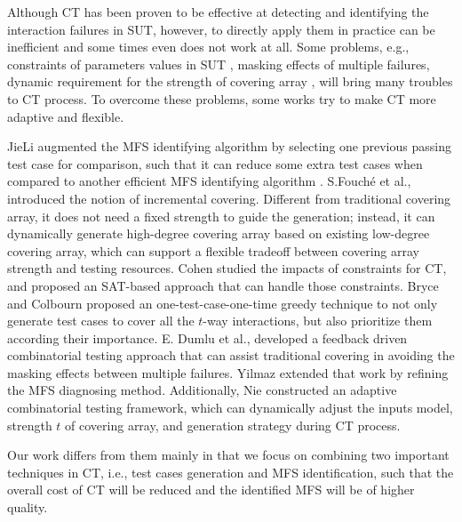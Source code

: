 \documentclass{sig-alternate}
\begin{document}
Although CT has been proven to be effective at detecting and identifying the interaction failures in SUT, however, to directly apply them in practice can be inefficient and some times even does not work at all. Some problems, e.g., constraints of parameters values in SUT \cite{cohen2007exploiting,cohen2008constructing}, masking effects of multiple failures\cite{dumlu2011feedback,yilmaz2013reducing}, dynamic requirement for the strength of covering array \cite{fouche2009incremental}, will bring many troubles to CT process. To overcome these problems, some works try to make CT more adaptive and flexible.


JieLi \cite{li2012improved} augmented the MFS identifying algorithm by selecting one previous passing test case for comparison, such that it can reduce some extra test cases when compared to another efficient MFS identifying algorithm \cite{zhang2011characterizing}. S.Fouch{\'e}  et al., \cite{fouche2009incremental} introduced the notion of incremental covering. Different from traditional covering array, it does not need a fixed strength to guide the generation; instead, it can dynamically generate high-degree covering array based on existing low-degree covering array, which can support a flexible tradeoff between covering array strength and testing resources. Cohen \cite{cohen2007exploiting,cohen2008constructing} studied the impacts of constraints for CT, and proposed an SAT-based approach that can handle those constraints.  Bryce and Colbourn \cite{bryce2006prioritized} proposed an one-test-case-one-time greedy technique to not only generate test cases to cover all the $t$-way interactions, but also prioritize them according their importance.  E. Dumlu et al., \cite{dumlu2011feedback} developed a feedback driven
combinatorial testing approach that can assist traditional covering in avoiding the masking effects between multiple failures. Yilmaz \cite{yilmaz2013reducing} extended that work by refining the MFS diagnosing method. Additionally, Nie \cite{nie2013adaptive} constructed an adaptive combinatorial testing framework, which can dynamically adjust the inputs model, strength $t$ of covering array, and generation strategy during CT process.

Our work differs from them mainly in that we focus on combining two important techniques in CT, i.e., test cases generation and MFS identification, such that the overall cost of CT will be reduced and the identified MFS will be of higher quality.
\end{document}
